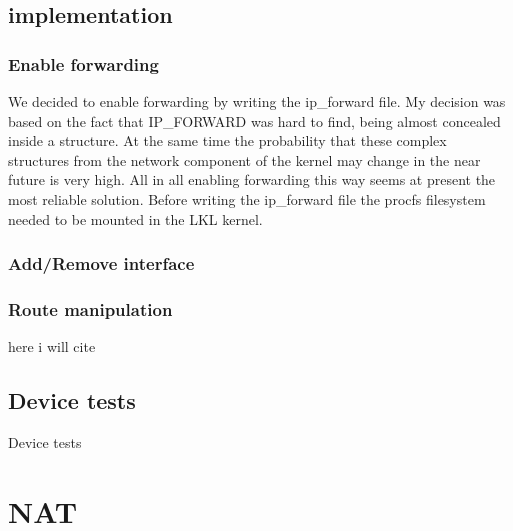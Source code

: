 \subsection{\project implementation}
\label{sub-sec:router-lklnet}
\subsubsection{Enable forwarding}
We decided to enable forwarding by writing the ip_forward file. My decision was based on the fact that IP_FORWARD was hard to find, being almost concealed inside a structure. At the same time the probability that these complex structures from the network component of the kernel may change in the near future is very high. All in all enabling forwarding this way seems at present the most reliable solution.
Before writing the ip_forward file the procfs filesystem needed to be mounted in the LKL kernel. 

\subsubsection{Add/Remove interface}
   
\subsubsection{Route manipulation}
here i will cite \cite{netlinksockets}

\subsection{Device tests}
\label{sub-sec:router-tests}

Device tests

\section{NAT}
\label{sub-sec:nat-impl}

